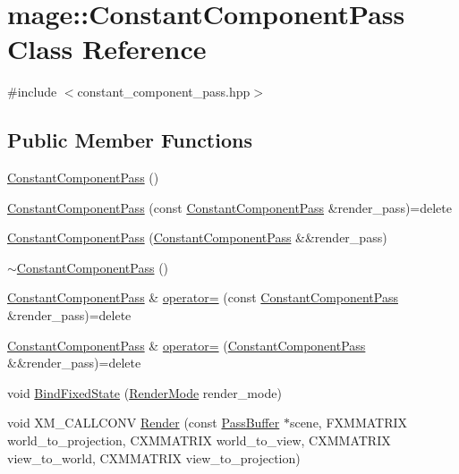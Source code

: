 \hypertarget{classmage_1_1_constant_component_pass}{}\section{mage\+:\+:Constant\+Component\+Pass Class Reference}
\label{classmage_1_1_constant_component_pass}


{\ttfamily \#include $<$constant\+\_\+component\+\_\+pass.\+hpp$>$}

\subsection*{Public Member Functions}
\begin{DoxyCompactItemize}
\item 
\hyperlink{classmage_1_1_constant_component_pass_acd197274863c82c9f1551c7e6171e4c9}{Constant\+Component\+Pass} ()
\item 
\hyperlink{classmage_1_1_constant_component_pass_ac3112acde3a0504febef699873efe1ff}{Constant\+Component\+Pass} (const \hyperlink{classmage_1_1_constant_component_pass}{Constant\+Component\+Pass} \&render\+\_\+pass)=delete
\item 
\hyperlink{classmage_1_1_constant_component_pass_a350d68fd2f8f17797361e7567d0337c7}{Constant\+Component\+Pass} (\hyperlink{classmage_1_1_constant_component_pass}{Constant\+Component\+Pass} \&\&render\+\_\+pass)
\item 
\hyperlink{classmage_1_1_constant_component_pass_aaa94607b422672dab4cb77f129382d1b}{$\sim$\+Constant\+Component\+Pass} ()
\item 
\hyperlink{classmage_1_1_constant_component_pass}{Constant\+Component\+Pass} \& \hyperlink{classmage_1_1_constant_component_pass_a513b83527fdb17a760032b76f3c17012}{operator=} (const \hyperlink{classmage_1_1_constant_component_pass}{Constant\+Component\+Pass} \&render\+\_\+pass)=delete
\item 
\hyperlink{classmage_1_1_constant_component_pass}{Constant\+Component\+Pass} \& \hyperlink{classmage_1_1_constant_component_pass_ab1944cfe6c59d28d34fb6c6d05bd0b96}{operator=} (\hyperlink{classmage_1_1_constant_component_pass}{Constant\+Component\+Pass} \&\&render\+\_\+pass)=delete
\item 
void \hyperlink{classmage_1_1_constant_component_pass_a87e9d62d5d93b1a66388ab0ccd494e8b}{Bind\+Fixed\+State} (\hyperlink{namespacemage_a5e7e18b0154373ce8fc942fe3f6b27fd}{Render\+Mode} render\+\_\+mode)
\item 
void X\+M\+\_\+\+C\+A\+L\+L\+C\+O\+NV \hyperlink{classmage_1_1_constant_component_pass_a1b19031fdb05dfde96f39563ddca22b4}{Render} (const \hyperlink{structmage_1_1_pass_buffer}{Pass\+Buffer} $\ast$scene, F\+X\+M\+M\+A\+T\+R\+IX world\+\_\+to\+\_\+projection, C\+X\+M\+M\+A\+T\+R\+IX world\+\_\+to\+\_\+view, C\+X\+M\+M\+A\+T\+R\+IX view\+\_\+to\+\_\+world, C\+X\+M\+M\+A\+T\+R\+IX view\+\_\+to\+\_\+projection)
\end{DoxyCompactItemize}
